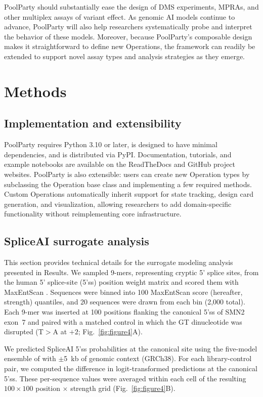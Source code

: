 \documentclass[twoside]{kinneylab_preprintstyle}
\begin{document}
PoolParty should substantially ease the design of DMS experiments, MPRAs, and other multiplex assays of variant effect. As genomic AI models continue to advance, PoolParty will also help researchers systematically probe and interpret the behavior of these models. Moreover, because PoolParty's composable design makes it straightforward to define new Operations, the framework can readily be extended to support novel assay types and analysis strategies as they emerge.

\section*{Methods}

\subsection{Implementation and extensibility}

PoolParty requires Python 3.10 or later, is designed to have minimal dependencies, and is distributed via PyPI. Documentation, tutorials, and example notebooks are available on the ReadTheDocs and GitHub project websites. PoolParty is also extensible: users can create new Operation types by subclassing the Operation base class and implementing a few required methods. Custom Operations automatically inherit support for state tracking, design card generation, and visualization, allowing researchers to add domain-specific functionality without reimplementing core infrastructure.

\subsection{SpliceAI surrogate analysis}

This section provides technical details for the surrogate modeling analysis presented in Results. We sampled 9-mers, representing cryptic 5' splice sites, from the human 5' splice-site (5'ss) position weight matrix \citep{Wong2018quantitative} and scored them with MaxEntScan \citep{Yeo2004me}. Sequences were binned into 100 MaxEntScan score (hereafter, strength) quantiles, and 20 sequences were drawn from each bin (2,000 total). Each 9-mer was inserted at 100 positions flanking the canonical 5'ss of SMN2 exon~7 and paired with a matched control in which the GT dinucleotide was disrupted (T$>$A at $+2$; Fig.~\ref{fig:figure4}A).

We predicted SpliceAI 5'ss probabilities at the canonical site using the five-model ensemble of \citet{Jaganathan2019ps} with $\pm$5~kb of genomic context (GRCh38). For each library-control pair, we computed the difference in logit-transformed predictions at the canonical 5'ss. These per-sequence values were averaged within each cell of the resulting $100 \times 100$ position $\times$ strength grid (Fig.~\ref{fig:figure4}B).
\end{document}
